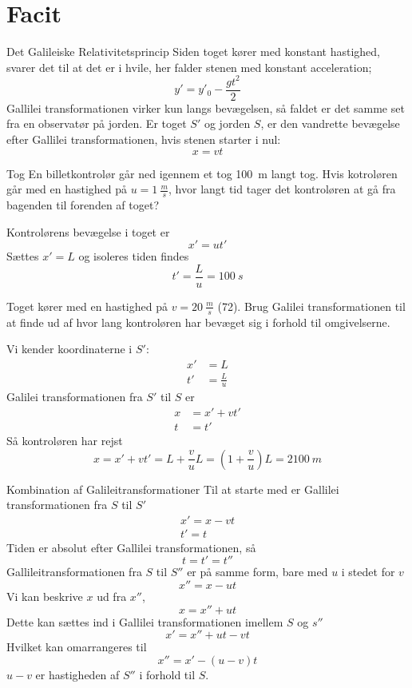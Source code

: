 \section{Facit}

\setcounter{opgave}{0}

\begin{opgave}{Det Galileiske Relativitetsprincip}
    \opg Siden toget kører med konstant hastighed, svarer det til at det er i hvile, her falder stenen med konstant acceleration;
    $$
        y'=y'_0-\frac{gt^2}{2}
    $$
    \opg Gallilei transformationen virker kun langs bevægelsen, så faldet er det samme set fra en observatør på jorden. Er toget $S'$ og jorden $S$, er den vandrette bevægelse efter Gallilei transformationen, hvis stenen starter i nul:
    $$
        x=vt
    $$
\end{opgave}

\begin{opgave}{Tog}
    En billetkontrolør går ned igennem et tog \SI{100}{m} langt tog.
    \opg Hvis kotroløren går med en hastighed på $u=\SI{1}{\frac{m}{s}}$, hvor langt tid tager det kontroløren at gå fra bagenden til forenden af toget?
    
    Kontrolørens bevægelse i toget er
    $$
        x'=ut'
    $$
    Sættes $x'=L$ og isoleres tiden findes
    $$
        t'=\frac{L}{u}=\SI{100}{s}
    $$
    
    Toget kører med en hastighed på $v=\SI{20}{\frac{m}{s}}$ (\SI{72}{}).
    \opg  Brug Galilei transformationen til at finde ud af hvor lang kontroløren har bevæget sig i forhold til omgivelserne.
    
    Vi kender koordinaterne i $S'$:
    \begin{align*}
        x'&=L\\
        t'&=\frac{L}{u}
    \end{align*}
    Galilei transformationen fra $S'$ til $S$ er
    \begin{align*}
        x&=x'+vt'\\
        t&=t'
    \end{align*}
    Så kontroløren har rejst
    $$
        x=x'+vt'=L+\frac{v}{u}L=\left(1+\frac{v}{u}\right)L=\SI{2100}{m}
    $$
\end{opgave}

\begin{opgave}{Kombination af Galileitransformationer}
    Til at starte med er Gallilei transformationen fra $S$ til $S'$
    \begin{align*}
        x'=x-vt\\
        t'=t
    \end{align*}
    Tiden er absolut efter Gallilei transformationen, så
    $$
        t=t'=t''
    $$
    \opg Gallileitransformationen fra $S$ til $S''$ er på samme form, bare med $u$ i stedet for $v$
    $$
        x''=x-ut
    $$
    \opg Vi kan beskrive $x$ ud fra $x''$, 
    $$
        x=x''+ut
    $$
    Dette kan sættes ind i Gallilei transformationen imellem $S$ og $s''$
    $$
        x'=x''+ut-vt
    $$
    Hvilket kan omarrangeres til 
    $$
        x''=x'-(u-v)t
    $$
    \opg $u-v$ er hastigheden af $S''$ i forhold til $S$.
\end{opgave}

